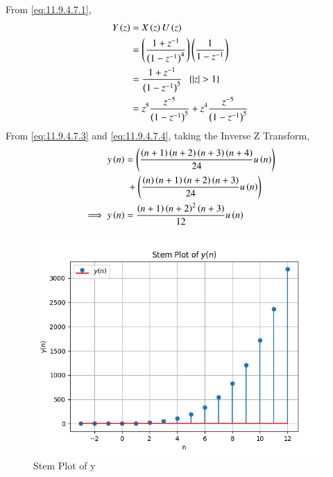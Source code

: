 \documentclass[journal,12pt,twocolumn]{IEEEtran}
\theoremstyle{remark}
\begin{document}
From \eqref{eq:11.9.4.7.1},
\begin{align}
    Y\left(z\right)&=X\left(z\right)U\left(z\right)\\
    &=\left(\frac{1+z^{-1}}{\left(1-z^{-1}\right)^4}\right)\left(\frac{1}{1-z^{-1}}\right)\\
    &=\frac{1+z^{-1}}{\left(1-z^{-1}\right)^5}\;\;\left\{\left\vert z\right\vert>1\right\}\\
    &=z^5\frac{z^{-5}}{\left(1-z^{-1}\right)^5}+z^4\frac{z^{-5}}{\left(1-z^{-1}\right)^5}
\end{align}
From \eqref{eq:11.9.4.7.3} and \eqref{eq:11.9.4.7.4}, taking the Inverse Z Transform,
\begin{align}
    y\left(n\right)&=\left(\frac{\left(n+1\right)\left(n+2\right)\left(n+3\right)\left(n+4\right)}{24}u\left(n\right)\right)\notag\\
    &\;+\left(\frac{\left(n\right)\left(n+1\right)\left(n+2\right)\left(n+3\right)}{24}u\left(n\right)\right)\\
    \implies y\left(n\right)&=\frac{\left(n+1\right)\left(n+2\right)^2\left(n+3\right)}{12}u\left(n\right)
\end{align}
\begin{figure}[h!]
    \centering
    \includegraphics[width=1\linewidth]{figs/Figure_1.png}
    \caption{Stem Plot of y}
\end{figure}
\end{document}
